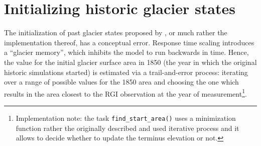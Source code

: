 
    \section{Initializing historic glacier states} %
    \label{sec:initializing_historic_glacier_states}

        The initialization of past glacier states proposed by \citet{Marzeion2012b}, or much rather the implementation thereof, has a conceptual error. Response time scaling introduces a ``glacier memory'', which inhibits the model to run backwards in time. Hence, the value for the initial glacier surface area in 1850 (the year in which the original historic simulations started) is estimated via a trail-and-error process: iterating over a range of possible values for the 1850 area and choosing the one which results in the area closest to the RGI observation at the year of measurement\footnote{Implementation note: the task \lstinline`find_start_area()` uses a minimization function rather the originally described and used iterative process and it allows to decide whether to update the terminus elevation or not.}.


